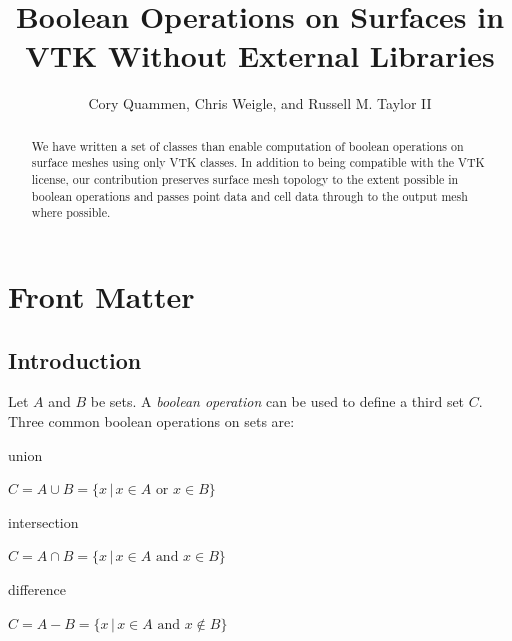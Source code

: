 \documentclass{InsightArticle}
\title{Boolean Operations on Surfaces in VTK Without External Libraries}
\author{Cory Quammen, Chris Weigle, and Russell M. Taylor II}
\newcommand{\IJhandlerIDnumber}{1338}
\begin{document}
%
% 
\IJhandlefooter{\IJhandlerIDnumber}


\ifpdf
\else
\fi


\maketitle


\ifhtml
\chapter*{Front Matter\label{front}}
\fi


\begin{abstract}
\noindent
We have written a set of classes than enable computation of boolean operations on surface meshes using only VTK classes. In addition to being compatible with the VTK license, our contribution preserves surface mesh topology to the extent possible in boolean operations and passes point data and cell data through to the output mesh where possible.

\end{abstract}

\IJhandlenote{\IJhandlerIDnumber}

\tableofcontents

\section{Introduction}
\label{sec:Introduction}

Let $A$ and $B$ be sets. A \emph{boolean operation} can be used to define a third set $C$. Three common boolean operations on sets are:

\begin{description}

\item union

 $C = A \cup B = \{ x \, | \, x \in A \text{ or } x \in B \}$

\item intersection

$C = A \cap B = \{ x \, | \, x \in A \text{ and } x \in B \}$

\item difference

$C = A - B = \{ x \, | \, x \in A \text{ and } x \notin B \}$

\end{description}
\end{document}

